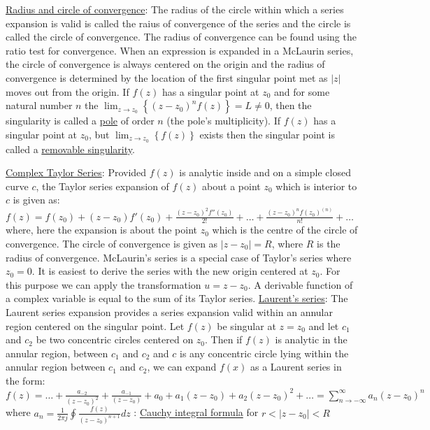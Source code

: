 \documentclass[12pt]{article}
\begin{document}
\begin{flushleft}
	\textbullet \quad \uline{Radius and circle of convergence}: The radius of the circle within which a series expansion is valid is called the raius of convergence of the series and the circle is called the circle of convergence. The radius of convergence can be found using the ratio test for convergence. When an expression is expanded in a McLaurin series, the circle of convergence is always centered on the origin and the radius of convergence is determined by the location of the first singular point met as $|z|$ moves out from the origin. \linebreak 
	\textbullet \quad If $f(z)$ has a singular point at $z_0$ and for some natural number $n$ the $\displaystyle \lim_{z\to z_0} \left\{ \left( z-z_0\right)^n f(z) \right\} = L \neq 0 $, then the singularity is called a \uline{pole} of order $n$ (the pole's multiplicity). \linebreak 
	\textbullet \quad If $f(z)$ has a singular point at $z_0$, but $\displaystyle \lim_{z\to z_0} \left\{ f(z) \right\}$ exists then the singular point is called a \uline{removable singularity}. \linebreak 
	
	\textbullet \quad \uline{Complex Taylor Series}: Provided $f(z)$ is analytic inside and on a simple closed curve $c$, the Taylor series expansion of $f(z)$ about a point $z_0$ which is interior to $c$ is given as: \linebreak 
	$\displaystyle f(z) = f(z_0) + (z-z_0) f'(z_0) + \frac{(z-z_0)^2 f''(z_0)}{2!} + \ldots + \frac{(z-z_0)^n f(z_0)^{(n)}}{n!} + \ldots $ \linebreak 
	where, here the expansion is about the point $z_0$ which is the centre of the circle of convergence. The circle of convergence is given as $|z-z_0| = R$, where $R$ is the radius of convergence. McLaurin's series is a special case of Taylor's series where $z_0 = 0$. It is easiest to derive the series with the new origin centered at $z_0$. For this purpose we can apply the transformation $u=z-z_0$. \linebreak 
	\textbullet \quad A derivable function of a complex variable is equal to the sum of its Taylor series. \linebreak 
	\textbullet \quad \uline{Laurent's series}: The Laurent series expansion provides a series expansion valid within an annular region centered on the singular point. Let $f(z)$ be singular at $z=z_0$ and let $c_1$ and $c_2$ be two concentric circles centered on $z_0$. Then if $f(z)$ is analytic in the annular region, between $c_1$ and $c_2$ and $c$ is any concentric circle lying within the annular region between $c_1$ and $c_2$, we can expand $f(x)$ as a Laurent series in the form: \linebreak 
	$\displaystyle f(z) = \ldots + \frac{a_{-2}}{(z-z_0)^2} + \frac{a_{-1}}{(z-z_0)} + a_0 + a_1 (z-z_0) + a_2 (z-z_0)^2 + \ldots = \sum \limits_{n\to -\infty}^{\infty} a_n \left( z-z_0 \right)^n$ \linebreak 
	where $\displaystyle a_n = \frac{1}{2\pi j} \oint \frac{f(z)}{(z-z_0)^{n+1}} dz$  :  \uline{Cauchy integral formula} \linebreak 
	for $\displaystyle r<\left|z-z_0\right| < R$ \linebreak 
	

\end{flushleft}
\end{document}
